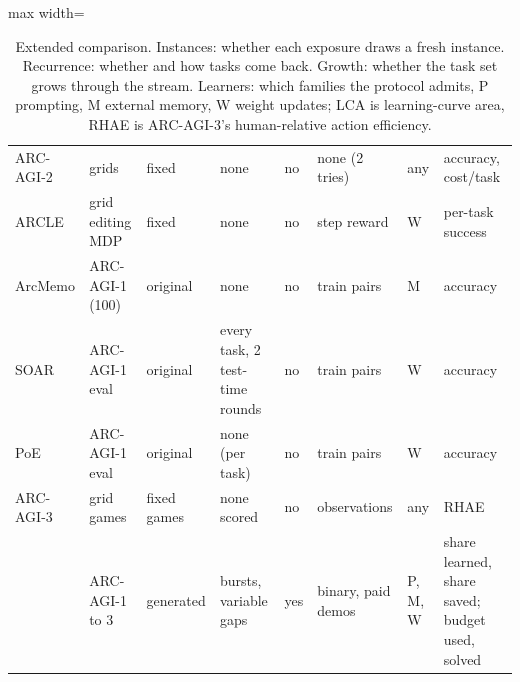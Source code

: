 \begin{table}
\begin{adjustbox}{max width=\textheight}
\begin{tabular}{llllllll}
ARC-AGI-2 \citep{chollet2025arcagi2} & grids & fixed & none & no & none (2 tries) & any & accuracy, cost/task \\
ARCLE \citep{lee2024arcle} & grid editing MDP & fixed & none & no & step reward & W & per-task success \\
ArcMemo \citep{ho2025arcmemo} & ARC-AGI-1 (100) & original & none & no & train pairs & M & accuracy \\
SOAR \citep{pourcel2025soar} & ARC-AGI-1 eval & original & every task, 2 test-time rounds & no & train pairs & W & accuracy \\
PoE \citep{franzen2025poe} & ARC-AGI-1 eval & original & none (per task) & no & train pairs & W & accuracy \\
ARC-AGI-3 \citep{arcprize2026arcagi3} & grid games & fixed games & none scored & no & observations & any & RHAE \\
\midrule
\bench{} & ARC-AGI-1 to 3 & generated & bursts, variable gaps & yes & binary, paid demos & P, M, W & share learned, share saved; budget used, solved \\
\bottomrule
\end{tabular}
\end{adjustbox}
\caption{Extended comparison. Instances: whether each exposure draws a fresh instance. Recurrence: whether and how tasks come back. Growth: whether the task set grows through the stream. Learners: which families the protocol admits, P prompting, M external memory, W weight updates; LCA is learning-curve area, RHAE is ARC-AGI-3's human-relative action efficiency.}
\label{tab:related-full}
\end{table}
